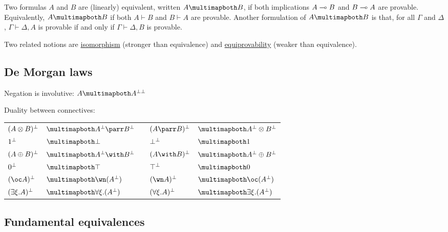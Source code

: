 Two formulas \(A\) and \(B\) are (linearly) equivalent, written
\(A\linequiv B\), if both implications \(A\multimap B\) and \(B\multimap A\) are
provable. Equivalently, \(A\linequiv B\) if both \(A\vdash B\) and
\(B\vdash A\) are provable. Another formulation of \(A\linequiv B\) is
that, for all \(\Gamma\) and \(\Delta\), \(\Gamma\vdash\Delta,A\) is
provable if and only if \(\Gamma\vdash\Delta,B\) is provable.

Two related notions are \hyperref[isomorphism]{isomorphism} (stronger than equivalence)
and \hyperref[equiprovability]{equiprovability} (weaker than equivalence).

\subsection{De Morgan laws}\label{de-morgan-laws}

Negation is involutive:
\qquad
\(A\linequiv A\biorth\)

Duality between connectives:
\begin{longtable}[]{@{}lllll@{}}
\toprule
\(( A \otimes B )^\bot\) & \(\linequiv A\orth \parr B\orth\) & &
\(( A \parr B )\orth\) &
\(\linequiv A\orth \tens B\orth\)\tabularnewline
\(1^\bot\) & \(\linequiv \bot\) & & \(\bot^\bot\) &
\(\linequiv \one\)\tabularnewline
\(( A \oplus B )^\bot\) & \(\linequiv A\orth \with B\orth\) & &
\(( A \with B )\orth\) &
\(\linequiv A\orth \plus B\orth\)\tabularnewline
\(0^\bot\) & \(\linequiv \top\) & & \(\top^\bot\) &
\(\linequiv \zero\)\tabularnewline
\(( \oc A )\orth\) & \(\linequiv \wn ( A\orth )\) & & \(( \wn A )\orth\)
& \(\linequiv \oc ( A\orth )\)\tabularnewline
\(( \exists \xi.A )^\bot\) & \(\linequiv \forall \xi.( A\orth )\) & &
\(( \forall \xi.A )^\bot\) &
\(\linequiv \exists \xi.( A\orth )\)\tabularnewline
\bottomrule
\end{longtable}

\subsection{Fundamental equivalences}\label{fundamental-equivalences}

